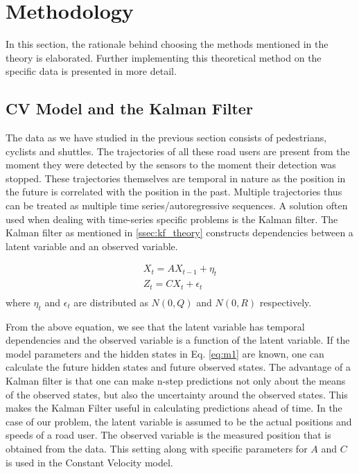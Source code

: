 \documentclass{article}
\begin{document}
\section{Methodology}
In this section, the rationale behind choosing the methods mentioned in the theory is elaborated. Further implementing this theoretical method on the specific data is presented in more detail. 

\subsection{CV Model and the Kalman Filter}\label{ssec:CV_model}

The data as we have studied in the previous section consists of pedestrians, cyclists and shuttles. The trajectories of all these road users are present from the moment they were detected by the sensors to the moment their detection was stopped. These trajectories themselves are temporal in nature as the position in the future is correlated with the position in the past. Multiple trajectories thus can be treated as multiple time series/autoregressive sequences. A solution often used when dealing with time-series specific problems is the Kalman filter. The Kalman filter as mentioned in \ref{ssec:kf_theory} constructs dependencies between a latent variable and an observed variable. 

\begin{equation}\label{eq:m1}
\begin{split}
    X_{t}=AX_{t-1} + \eta_t\\
    Z_{t}=CX_{t}+\epsilon_t\\
\end{split}
\end{equation}
where $\eta_t$ and $\epsilon_t$ are distributed as $N(0,Q)$ and $N(0,R)$ respectively. 

From the above equation, we see that the latent variable has temporal dependencies and the observed variable is a function of the latent variable. If the model parameters and the hidden states in Eq. \ref{eq:m1} are known, one can calculate the future hidden states and future observed states. The advantage of a Kalman filter is that one can make n-step predictions not only about the means of the observed states, but also the uncertainty around the observed states. This makes the Kalman Filter useful in calculating predictions ahead of time. In the case of our problem, the latent variable is assumed to be the actual positions and speeds of a road user. The observed variable is the measured position that is obtained from the data. This setting along with specific parameters for $A$ and $C$ is used in the Constant Velocity model. 
\end{document}

